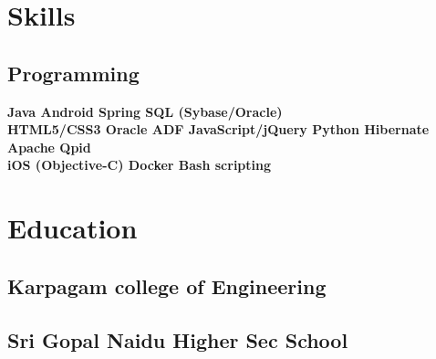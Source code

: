 \documentclass[a4paper]{srika-resume} %
\begin{document}
\begin{minipage}[t]{0.35\textwidth} %


\section{Skills}

\subsection{Programming}

\textbf{Java \textbullet{} Android \textbullet{} Spring \textbullet{} SQL (Sybase/Oracle) } \\
\textbf{HTML5/CSS3 \textbullet{} Oracle ADF \textbullet{} JavaScript/jQuery \textbullet{} Python \textbullet{} Hibernate \textbullet{} Apache Qpid} \\
\textbf{iOS (Objective-C) \textbullet{} Docker \textbullet{} Bash scripting } \\

\sectionspace %


\section{Education} 
\subsection{Karpagam college of Engineering}


\sectionspace %


\subsection{Sri Gopal Naidu Higher Sec School}



\end{minipage}
\end{document}

